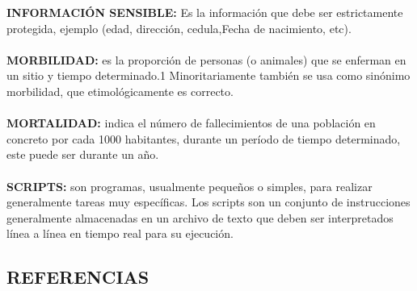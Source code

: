 \documentclass[a4paper,openright,12pt]{book}
\theoremstyle{definition}
\theoremstyle{remark}
\begin{document}
\textbf{INFORMACIÓN SENSIBLE:} Es la información que debe ser estrictamente protegida, ejemplo (edad, dirección, cedula,Fecha de nacimiento, etc).
\\\\
\textbf{MORBILIDAD:} es la proporción de personas (o animales) que se enferman en un sitio y tiempo determinado.1 Minoritariamente también se usa como sinónimo morbilidad, que etimológicamente es correcto.  \\\\
\textbf{MORTALIDAD:} indica el número de fallecimientos de una población en concreto por cada 1000 habitantes, durante un período de tiempo determinado, este puede ser durante un año. \\\\
\textbf{SCRIPTS:} son programas, usualmente pequeños o simples, para realizar generalmente tareas muy específicas. Los scripts son un conjunto de instrucciones generalmente almacenadas en un archivo de texto que deben ser interpretados línea a línea en tiempo real para su ejecución.
\begin{center}
 \chapter{REFERENCIAS}\label{cap.referencias}
\end{center}
\end{document}
